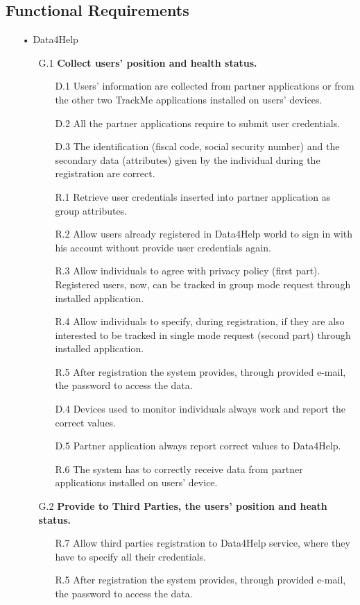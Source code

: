 \subsection{Functional Requirements}
\begin{enumerate}
\item[•]{\Large Data4Help}
	\begin{enumerate}
	\item [G.1] \textbf{Collect users' position and health status.}
		\begin{enumerate}
		\item [D.1] Users' information are collected from partner applications or from the other two TrackMe applications installed on users' devices.
		\item [D.2] All the partner applications require to submit user credentials.
		\item [D.3] The identification (fiscal code, social security number) and the secondary data (attributes) given by the individual during the registration are correct.
		\item [R.1] Retrieve user credentials inserted into partner application as group attributes.
		\item [R.2] Allow users already registered in Data4Help world to sign in with his account without provide user credentials again.
		\item [R.3] Allow individuals to agree with privacy policy (first part). Registered users, now, can be tracked in group mode request through installed application.  
		\item [R.4] Allow individuals to specify, during registration, if they are also interested to be tracked in single mode request (second part) through installed application.
		\item [R.5] After registration the system provides, through provided e-mail, the password to access the data.
		\item [D.4] Devices used to monitor individuals always work and report 			the correct values.	
    	\item [D.5] Partner application always report correct values to Data4Help.
    	\item [R.6] The system has to correctly receive data from partner applications installed on users' device.
    	\end{enumerate}	
    	
    \item [G.2] \textbf{Provide to Third Parties, the users' position and heath status.}
    	\begin{enumerate} 
    	\item [R.7] Allow third parties registration to Data4Help service, where they have to specify all their credentials.
    	\item [R.5] After registration the system provides, through provided e-mail, the password to access the data.
    	\end{enumerate}	
		

\end{enumerate}
\end{enumerate}
